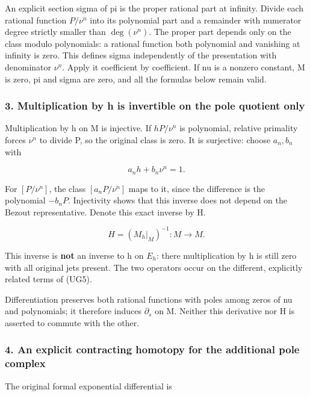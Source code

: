 An explicit section sigma of pi is the proper rational part at infinity. Divide each rational function \(P/\nu^n\) into its polynomial part and a remainder with numerator degree strictly smaller than \(\deg(\nu^n)\). The proper part depends only on the class modulo polynomials: a rational function both polynomial and vanishing at infinity is zero. This defines sigma independently of the presentation with denominator \(\nu^n\). Apply it coefficient by coefficient. If nu is a nonzero constant, M is zero, pi and sigma are zero, and all the formulas below remain valid.

\subsubsection{3. Multiplication by h is invertible on the pole quotient only}\label{endpoint-f1_unit_gauge--multiplication-by-h-is-invertible-on-the-pole-quotient-only}

Multiplication by h on M is injective. If \(hP/\nu^n\) is polynomial, relative primality forces \(\nu^n\) to divide P, so the original class is zero. It is surjective: choose \(a_n,b_n\) with

\[
a_n h+b_n\nu^n=1.
\]

For \([P/\nu^n]\), the class \([a_n P/\nu^n]\) maps to it, since the difference is the polynomial \(-b_n P\). Injectivity shows that this inverse does not depend on the Bezout representative. Denote this exact inverse by H.

\[
H=(M_h|_M)^{-1}:M\longrightarrow M.
\tag{UG6}
\]

This inverse is \textbf{not} an inverse to h on \(E_h\): there multiplication by h is still zero with all original jets present. The two operators occur on the different, explicitly related terms of (UG5).

Differentiation preserves both rational functions with poles among zeros of nu and polynomials; it therefore induces \(\partial_s\) on M. Neither this derivative nor H is asserted to commute with the other.

\subsubsection{4. An explicit contracting homotopy for the additional pole complex}\label{endpoint-f1_unit_gauge--an-explicit-contracting-homotopy-for-the-additional-pole-complex}

The original formal exponential differential is

